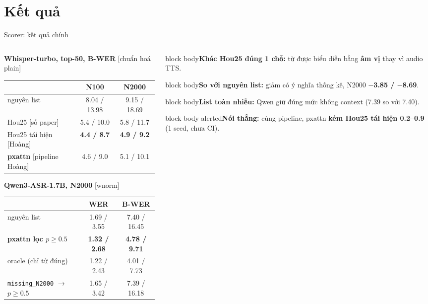 \documentclass[aspectratio=169,xcolor=table]{beamer}
\newcommand{\hi}[1]{\textcolor{Primary}{\textbf{#1}}}
\newcommand{\bad}[1]{\textcolor{RiskRed}{\textbf{#1}}}
\newcommand{\good}[1]{\textcolor{GoodGreen}{\textbf{#1}}}
\newcommand{\src}[1]{{\tiny\color{TextGray}[#1]}}
\newcommand{\ra}{$\rightarrow$}
\newcommand{\nbox}[2][block body]{\begin{beamercolorbox}[sep=0.45em,rounded=true]{#1}\footnotesize #2\end{beamercolorbox}}
\begin{document}
\section{Kết quả}
\begin{frame}{Scorer: kết quả chính}
\begin{columns}[T]
\begin{column}{0.53\textwidth}
\centering\scriptsize\setlength{\tabcolsep}{3pt}
\textbf{Whisper-turbo, top-50, B-WER} \src{chuẩn hoá plain}\par\vspace{0.05cm}
\begin{tabular}{lcc}
\toprule
 & N100 & N2000\\
\midrule
nguyên list & 8.04 / 13.98 & 9.15 / 18.69\\
Hou25 \src{số paper} & 5.4 / 10.0 & 5.8 / 11.7\\
Hou25 tái hiện \src{Hoàng} & \good{4.4 / 8.7} & \good{4.9 / 9.2}\\
\textbf{pxattn} \src{pipeline Hoàng} & 4.6 / 9.0 & 5.1 / 10.1\\
\bottomrule
\end{tabular}\par\vspace{0.2cm}
\textbf{Qwen3-ASR-1.7B, N2000} \src{wnorm}\par\vspace{0.05cm}
\begin{tabular}{lcc}
\toprule
 & WER & B-WER\\
\midrule
nguyên list & 1.69 / 3.55 & 7.40 / 16.45\\
\textbf{pxattn lọc $p\geq0.5$} & \good{1.32 / 2.68} & \good{4.78 / 9.71}\\
oracle (chỉ từ đúng) & 1.22 / 2.43 & 4.01 / 7.73\\
\texttt{missing\_N2000} \ra{} $p\geq0.5$ & 1.65 / 3.42 & 7.39 / 16.18\\
\bottomrule
\end{tabular}
\end{column}
\begin{column}{0.44\textwidth}
\nbox{\textbf{Khác Hou25 đúng 1 chỗ:} từ được biểu diễn bằng \hi{âm vị} thay vì audio TTS.}
\vspace{0.08cm}
\nbox{\textbf{So với nguyên list:} giảm có ý nghĩa thống kê, N2000 \good{$-$3.85 / $-$8.69}.}
\vspace{0.08cm}
\nbox{\textbf{List toàn nhiễu:} Qwen giữ đúng mức không context (7.39 so với 7.40).}
\vspace{0.08cm}
\nbox[block body alerted]{\textbf{Nói thẳng:} cùng pipeline, pxattn \bad{kém Hou25 tái hiện 0.2--0.9} (1 seed, chưa CI).}
\end{column}
\end{columns}
\end{frame}
\end{document}
